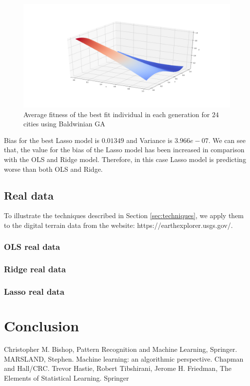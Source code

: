 \documentclass [11pt]{article}
\begin{document}
\begin{figure}[H]
\centering
\includegraphics[width=1\textwidth]{figures/LassoFranke.png}
        \caption{Average fitness of the best fit individual in each generation for $24$ cities using Baldwinian GA}
        \label{fig:LassoFranke}
\end{figure}

Bias for the best Lasso model is $0.01349$ and Variance is $3.966e-07$. We can see that, the value for the bias of the Lasso model has been increased in comparison with the OLS and Ridge model. Therefore, in this case Lasso model is predicting worse than both OLS and Ridge.

\subsection{Real data}
\label{sec:realdata}
To illustrate the techniques described in Section \ref{sec:techniques}, we apply them to the digital terrain data from the website: https://earthexplorer.usgs.gov/.
\subsubsection{OLS real data}
\subsubsection{Ridge real data}
\subsubsection{Lasso real data}

\section*{Conclusion}

\begin{thebibliography}{111}
\raggedright
{} Christopher M. Bishop, Pattern Recognition and Machine Learning, Springer.
 MARSLAND, Stephen. Machine learning: an algorithmic perspective. Chapman and Hall/CRC.
 Trevor Hastie, Robert Tibshirani, Jerome H. Friedman, The Elements of Statistical Learning. Springer
\end{thebibliography}
\end{document}
